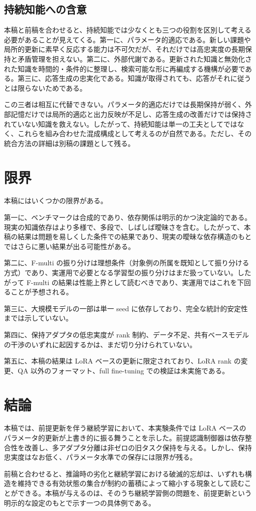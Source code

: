 \documentclass[12pt,a4paper]{article}
\begin{document}
\subsection{持続知能への含意}\label{ux6301ux7d9aux77e5ux80fdux3078ux306eux542bux610f}

本稿と前稿を合わせると、持続知能では少なくとも三つの役割を区別して考える必要があることが見えてくる。第一に、パラメータ的適応である。新しい課題や局所的更新に素早く反応する能力は不可欠だが、それだけでは高忠実度の長期保持と矛盾管理を担えない。第二に、外部代謝である。更新された知識と無効化された知識を時間的・条件的に整理し、検索可能な形に再編成する機構が必要である。第三に、応答生成の忠実化である。知識が取得されても、応答がそれに従うとは限らないためである。

この三者は相互に代替できない。パラメータ的適応だけでは長期保持が弱く、外部記憶だけでは局所的適応と出力反映が不足し、応答生成の改善だけでは保持されていない知識を救えない。したがって、持続知能は単一の工夫としてではなく、これらを組み合わせた混成構成として考えるのが自然である。ただし、その統合方法の詳細は別稿の課題として残る。

\section{限界}\label{ux9650ux754c}

本稿にはいくつかの限界がある。

第一に、ベンチマークは合成的であり、依存関係は明示的かつ決定論的である。現実の知識依存はより多様で、多段で、しばしば曖昧さを含む。したがって、本稿の結果は問題を易しくした条件での結果であり、現実の曖昧な依存構造のもとではさらに悪い結果が出る可能性がある。

第二に、F-multi の振り分けは理想条件（対象例の所属を既知として振り分ける方式）であり、実運用で必要となる学習型の振り分けはまだ扱っていない。したがって F-multi の結果は性能上界として読むべきであり、実運用ではこれを下回ることが予想される。

第三に、大規模モデルの一部は単一 seed に依存しており、完全な統計的安定性までは示していない。

第四に、保持アダプタの低忠実度が rank 制約、データ不足、共有ベースモデルの干渉のいずれに起因するかは、まだ切り分けられていない。

第五に、本稿の結果は LoRA ベースの更新に限定されており、LoRA rank の変更、QA 以外のフォーマット、full fine-tuning での検証は未実施である。

\section{結論}\label{ux7d50ux8ad6}

本稿では、前提更新を伴う継続学習において、本実験条件では LoRA ベースのパラメータ的更新が上書き的に振る舞うことを示した。前提認識制御器は依存整合性を改善し、多アダプタ分離は非ゼロの旧タスク保持を与える。しかし、保持忠実度はなお低く、パラメータ水準での保存には限界が残る。

前稿と合わせると、推論時の劣化と継続学習における破滅的忘却は、いずれも構造を維持できる有効状態の集合が制約の蓄積によって縮小する現象として読むことができる。本稿が与えるのは、そのうち継続学習側の問題を、前提更新という明示的な設定のもとで示す一つの具体例である。
\end{document}
